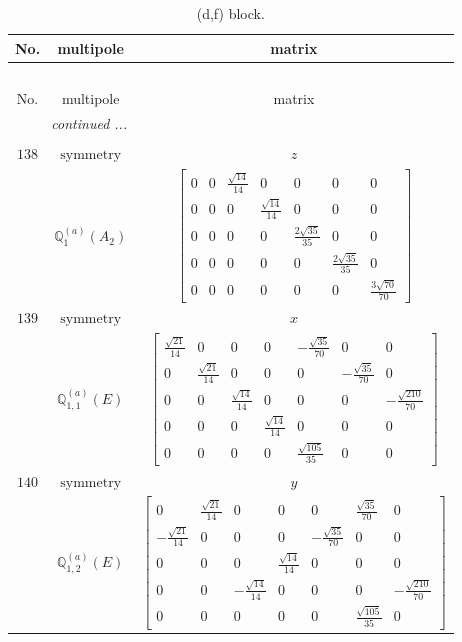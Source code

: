 \documentclass[fleqn,8pt,landscape]{jsarticle}
\begin{document}
\begin{longtable}{ccc}
\caption{(d,f) block.}
 \\
 \hline \hline
No. & multipole & matrix \\ \hline \endfirsthead

\multicolumn{2}{l}{\tablename\ \thetable{}} \\
 \hline \hline
No. & multipole & matrix \\ \hline \endhead

 \hline \hline
\multicolumn{2}{r}{\footnotesize\it continued ...} \\ \endfoot

 \hline \hline
\multicolumn{2}{r}{} \\ \endlastfoot

$ 138 $ & $ \text{symmetry} $ & $ z $ \\
$  $ & $ \mathbb{Q}_{1}^{(a)}(A_{2}) $ & $ \begin{bmatrix} 0 & 0 & \frac{\sqrt{14}}{14} & 0 & 0 & 0 & 0 \\ 0 & 0 & 0 & \frac{\sqrt{14}}{14} & 0 & 0 & 0 \\ 0 & 0 & 0 & 0 & \frac{2 \sqrt{35}}{35} & 0 & 0 \\ 0 & 0 & 0 & 0 & 0 & \frac{2 \sqrt{35}}{35} & 0 \\ 0 & 0 & 0 & 0 & 0 & 0 & \frac{3 \sqrt{70}}{70} \end{bmatrix} $ \\ \hline
$ 139 $ & $ \text{symmetry} $ & $ x $ \\
$  $ & $ \mathbb{Q}_{1,1}^{(a)}(E) $ & $ \begin{bmatrix} \frac{\sqrt{21}}{14} & 0 & 0 & 0 & - \frac{\sqrt{35}}{70} & 0 & 0 \\ 0 & \frac{\sqrt{21}}{14} & 0 & 0 & 0 & - \frac{\sqrt{35}}{70} & 0 \\ 0 & 0 & \frac{\sqrt{14}}{14} & 0 & 0 & 0 & - \frac{\sqrt{210}}{70} \\ 0 & 0 & 0 & \frac{\sqrt{14}}{14} & 0 & 0 & 0 \\ 0 & 0 & 0 & 0 & \frac{\sqrt{105}}{35} & 0 & 0 \end{bmatrix} $ \\ \hline
$ 140 $ & $ \text{symmetry} $ & $ y $ \\
$  $ & $ \mathbb{Q}_{1,2}^{(a)}(E) $ & $ \begin{bmatrix} 0 & \frac{\sqrt{21}}{14} & 0 & 0 & 0 & \frac{\sqrt{35}}{70} & 0 \\ - \frac{\sqrt{21}}{14} & 0 & 0 & 0 & - \frac{\sqrt{35}}{70} & 0 & 0 \\ 0 & 0 & 0 & \frac{\sqrt{14}}{14} & 0 & 0 & 0 \\ 0 & 0 & - \frac{\sqrt{14}}{14} & 0 & 0 & 0 & - \frac{\sqrt{210}}{70} \\ 0 & 0 & 0 & 0 & 0 & \frac{\sqrt{105}}{35} & 0 \end{bmatrix} $ \\ \hline

\end{longtable}
\end{document}
